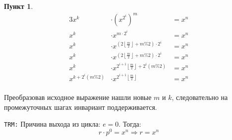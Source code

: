 \documentclass[11pt,a4paper]{scrarticle}
\theoremstyle{definition}
\newtheorem{subtask}{Пункт}
\begin{document}
\begin{subtask}
	\begin{alignat*}{3}
		x^{k}                  & \cdot \left(x^{2^{i}}\right)^{m}                                                     & = x^{n} \\
		x^{k}                  & \cdot x^{m \cdot 2^{i}}                                                              & = x^{n} \\
		x^{k}                  & \cdot x^{\left(2 \left\lfloor \frac{m}{2} \right\rfloor + m \% 2\right) \cdot 2^{i}} & = x^{n} \\
		x^{k}                  & \cdot x^{\left(2 \left\lfloor \frac{m}{2} \right\rfloor + m \% 2\right) \cdot 2^{i}} & = x^{n} \\
		x^{k}                  & \cdot x^{2^{i+1} \left\lfloor \frac{m}{2} \right\rfloor + 2^{i} (m \% 2)}            & = x^{n} \\
		x^{k + 2^{i} (m \% 2)} & \cdot x^{2^{i+1} \left\lfloor \frac{m}{2} \right\rfloor}                             & = x^{n} \\
	\end{alignat*}

	Преобразовав исходное выражение нашли новые $m$ и $k$, следовательно на промежуточных шагах инвариант поддерживается.

	\texttt{TRM:} Причина выхода из цикла: $e = 0$. Тогда:
	$$
		r \cdot p^{0} = x^{n} \Rightarrow r = x^{n}
	$$

\end{subtask}
\end{document}
